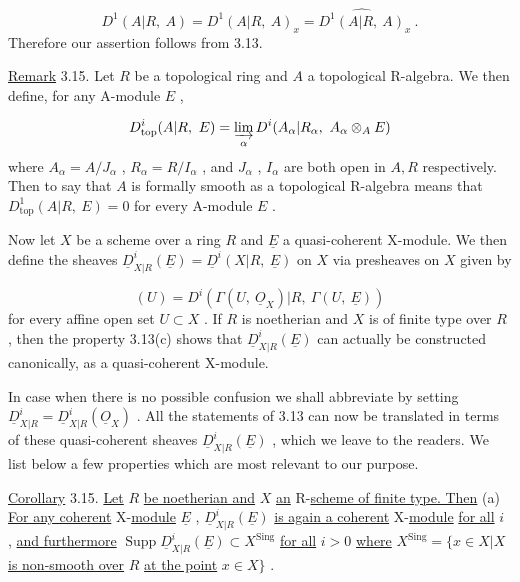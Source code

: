 \begin{equation*}
D^1(A|R,\ A) = D^1(A|R,\ A)_x = \widehat{D^1(A|R,\ A)}_x\ .
\end{equation*}
Therefore our assertion follows from 3.13.

\underline{Remark} 3.15.  Let  $R$  be a topological ring and  $A$  a topological R-algebra. We then define, for any A-module  $E$  ,

\begin{equation*}
D^i_{\mathrm{top}}(A|R,\ E) = \varinjlim_{\alpha} D^i(A_\alpha|R_\alpha,\ A_\alpha \otimes_A E)
\end{equation*}
where  $A_\alpha = A/J_\alpha$ , $R_\alpha = R/I_\alpha$  , and  $J_\alpha$ , $I_\alpha$  are both open in  $A, R$  respectively. Then to say that  $A$  is formally smooth as a topological R-algebra means that  $D^1_{\mathrm{top}}(A|R,\ E) = 0$  for every A-module  $E$  .

        Now let  $X$  be a scheme over a ring  $R$  and  $\underline{E}$  a quasi-coherent  X-module. We then define the sheaves  $\underline{D}^i_{X|R}(\underline{E}) = \underline{D}^i(X|R,\ \underline{E})$  on  $X$  via presheaves on  $X$  given by

\begin{equation*}
[\underline{D}^i_{X|R}(\underline{E})](U) = D^i(\Gamma(U,\ \underline{O}_X)|R,\ \Gamma(U,\ \underline{E}))
\end{equation*}
for every affine open set  $U \subset X$  . If  $R$  is noetherian and  $X$  is of finite type over  $R$  , then the property 3.13(c) shows that  $\underline{D}^i_{X|R}(\underline{E})$  can actually be constructed canonically, as a quasi-coherent X-module.

        In case when there is no possible confusion we shall abbreviate by setting  $\underline{D}^i_{X|R} = \underline{D}^i_{X|R}(\underline{O}_X)$  . All the statements of 3.13 can now be translated in terms of these quasi-coherent sheaves  $\underline{D}^i_{X|R}(\underline{E})$  , which we leave to the readers. We list below a few properties which are most relevant to our purpose.

\underline{Corollary} 3.15. \underline{Let}  $R$  \underline{be noetherian and}  $X$  \underline{an} R-\underline{scheme of finite type. Then}
(a)  \underline{For any coherent} X-\underline{module}  $\underline{E}$ , $\underline{D}^i_{X|R}(\underline{E})$  \underline{is again a coherent} X-\underline{module} \underline{for all}  $i$ , \underline{and furthermore}  $\operatorname{Supp} \underline{D}^i_{X|R}(\underline{E}) \subset X^{\mathrm{Sing}}$  \underline{for all}  $i > 0$  \underline{where} $X^{\mathrm{Sing}} = \{x \in X| X$ \underline{is non-smooth over}  $R$  \underline{at the point}  $x \in X\}$ .

